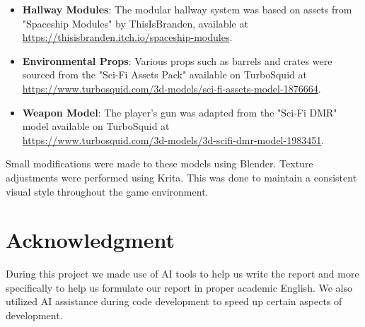 \documentclass{article}
\begin{document}
\begin{itemize}
    \item \textbf{Hallway Modules}: The modular hallway system was based on assets from "Spaceship Modules" by ThisIsBranden, available at \url{https://thisisbranden.itch.io/spaceship-modules}.

    \item \textbf{Environmental Props}: Various props such as barrels and crates were sourced from the "Sci-Fi Assets Pack" available on TurboSquid at \url{https://www.turbosquid.com/3d-models/sci-fi-assets-model-1876664}.

    \item \textbf{Weapon Model}: The player's gun was adapted from the "Sci-Fi DMR" model available on TurboSquid at\\\url{https://www.turbosquid.com/3d-models/3d-scifi-dmr-model-1983451}.
\end{itemize}

Small modifications were made to these models using Blender. Texture adjustments were performed using Krita. This was done to maintain a consistent visual style throughout the game environment.

\section{Acknowledgment}
During this project we made use of AI tools to help us write the report and more
specifically to help us formulate our report in proper academic English. We also
utilized AI assistance during code development to speed up certain aspects of development.

% 
% 
\end{document}

